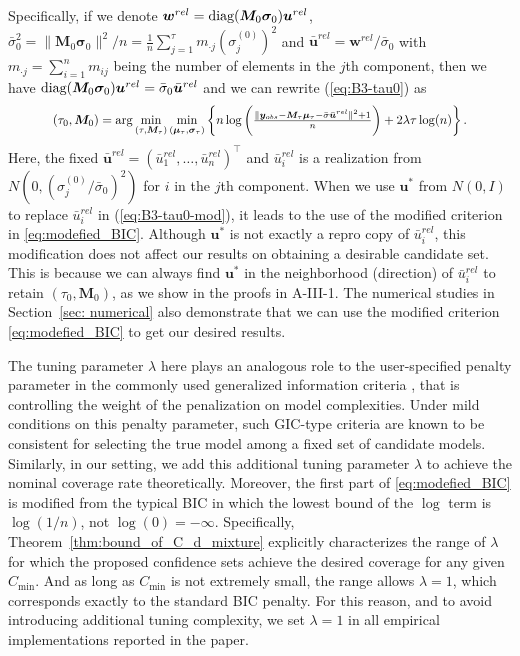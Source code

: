 \documentclass[12pt]{article}
\theoremstyle{shortspace}
\def\*#1{\bm{#1}}
\newcommand{\diag}{\hbox{diag}}
\begin{document}
Specifically, if we denote $\*w^{rel} = \diag({\bm M}_{0} \*\sigma_0)\*u^{rel}$, $\bar \sigma_0^2 = \|{\bm M}_{0} \*\sigma_0\|^2/n = \frac 1n \sum_{j = 1}^\tau m_{\cdot j}(\sigma_j^{(0)})^2$ and $\bar {\*u}^{rel} = \*w^{rel}/\bar \sigma_0$ with $m_{\cdot j} = \sum_{i =1}^n m_{ij}$ being the number of elements in the $j$th component, then we have $\diag({\bm M}_{0} \*\sigma_0)\*u^{rel} = \bar \sigma_0\bar {\*u}^{rel}$ and 
we 
can rewrite (\ref{eq:B3-tau0}) as
\begin{align}
\label{eq:B3-tau0-mod}
\resizebox{.86\hsize}{!}{$(\tau_0, \*M_0) =\arg\min\limits_{(\tau, \*M_\tau)} \min\limits_{(\*\mu_\tau, \*\sigma_\tau)}  \left\{n\log \bigg(\frac{\|\*y_{obs} - {\*M}_{\tau} {\*\mu}_{\tau} - \bar \sigma \bar{\*u}^{rel}\|^2+1}{n}\bigg) + 2\lambda\tau\log(n)\right\}.$}
\end{align}
Here, the fixed $\bar {\*u}^{rel} = (\bar u_1^{rel}, \ldots, \bar u_n^{rel})^\top$ and $\bar u_i^{rel}$ is a realization from $N(0, (\sigma_{j}^{(0)}/\bar \sigma_0)^2)$ for $i$ in the $j$th component. 
When we use $\*u^*$ from $N(0,I)$ to replace $\bar u_i^{rel}$ in (\ref{eq:B3-tau0-mod}), it leads to the use of the modified criterion in \eqref{eq:modefied_BIC}. 
Although $\*u^*$ is not exactly a repro copy of $\bar u_i^{rel}$, 
this modification does not affect our results on obtaining a desirable candidate set. This is because we can always find $\*u^*$ in the neighborhood (direction) of $\bar u_i^{rel}$ to retain $(\tau_0, \*M_0)$, as we show in the proofs in A-III-1.  
The numerical studies in Section~\ref{sec: numerical} also demonstrate that we can use the modified criterion \eqref{eq:modefied_BIC} to get our desired results. 

The tuning parameter $\lambda$ here plays an analogous role to the user-specified penalty parameter in the commonly used generalized information criteria \citep{konishi1996gic,konishi2008information}, that is controlling the weight of the penalization on model complexities. Under mild conditions on this penalty parameter, such GIC-type criteria are known to be consistent for selecting the true model among a fixed set of candidate models. Similarly, in our setting, we add this additional tuning parameter $\lambda$ to achieve the nominal coverage rate theoretically. {Moreover, the first part of \eqref{eq:modefied_BIC} is modified from the typical BIC in which the lowest bound of the $\log$ term is $\log(1/n)$, not $\log(0) = - \infty$.} Specifically, Theorem~\ref{thm:bound_of_C_d_mixture} explicitly characterizes the  range of \(\lambda\) for which the proposed confidence sets achieve the desired coverage for any given $C_{\min}$. And as long as $C_{\min}$ is not extremely small, the range allows \(\lambda = 1\), which corresponds exactly to the standard BIC penalty. For this reason, and to avoid introducing additional tuning complexity, we set \(\lambda = 1\) in all empirical implementations reported in the paper. 
\end{document}

